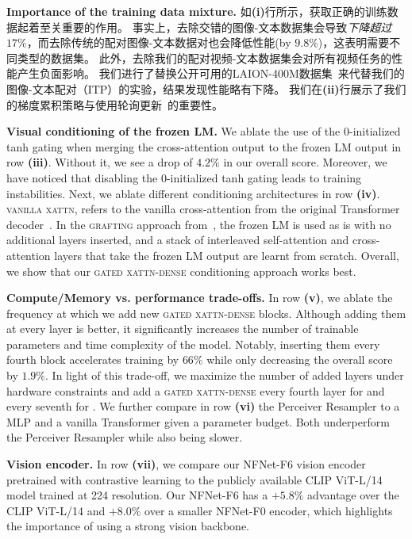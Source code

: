  \textbf{Importance of the training data mixture.}
 如\textbf{(i)}行所示，获取正确的训练数据起着至关重要的作用。 事实上，去除交错的图像-文本数据集\mmmw{}会导致\emph{下降超过$17\%$}，而去除传统的配对图像-文本数据对也会降低性能(by $9.8\%$)，这表明需要不同类型的数据集。
 此外，去除我们的配对视频-文本数据集会对所有视频任务的性能产生负面影响。 
 我们进行了替换公开可用的LAION-400M数据集~\cite{schuhmann2021laion}来代替我们的图像-文本配对（ITP）的实验，结果发现性能略有下降。 我们在\textbf{(ii)}行展示了我们的梯度累积策略与使用轮询更新~\citep{cho2021unifying}的重要性。

\noindent   
\textbf{Visual conditioning of the frozen LM.}
We ablate the use of the 0-initialized tanh gating when merging the cross-attention output to the frozen LM output in row \textbf{(iii)}.
Without it, we see a drop of $4.2\%$ in our overall score.
Moreover, we have noticed that disabling the 0-initialized tanh gating leads to training instabilities.
Next, we ablate different conditioning architectures in row \textbf{(iv)}.
\textsc{vanilla xattn}, refers to the vanilla cross-attention from the original Transformer decoder~\citep{vaswani2017attention}.
In the \textsc{grafting} approach from~\cite{luo2022vc}, the frozen LM is used as is with no additional layers inserted, and a stack of interleaved self-attention and cross-attention layers that take the frozen LM output are learnt from scratch.
Overall, we show that our \textsc{gated xattn-dense} conditioning approach works best.

\noindent
\textbf{Compute/Memory vs. performance trade-offs.}
In row \textbf{(v)}, we ablate the frequency at which we add new \textsc{gated xattn-dense} blocks.
Although adding them at every layer is better, it significantly increases the number of trainable parameters and time complexity of the model.
Notably, inserting them every fourth block accelerates training by $66\%$ while only decreasing the overall score by $1.9\%$.
In light of this trade-off, we maximize the number of added layers under hardware constraints and add a \textsc{gated xattn-dense} every fourth layer for \medium{} and every seventh for \largemfull{}.
We further compare in row \textbf{(vi)} the Perceiver Resampler to a MLP and a vanilla Transformer given a parameter budget.
Both underperform the Perceiver Resampler while also being slower.


\noindent
\textbf{Vision encoder.}
In row \textbf{(vii)}, we compare our NFNet-F6 vision encoder pretrained with contrastive learning  to the publicly available CLIP ViT-L/14~\citep{clip} model trained at 224 resolution.
Our NFNet-F6 has a $+5.8\%$ advantage over the CLIP ViT-L/14 and $+8.0\%$ over a smaller NFNet-F0 encoder, which highlights the importance of using a strong vision backbone.

